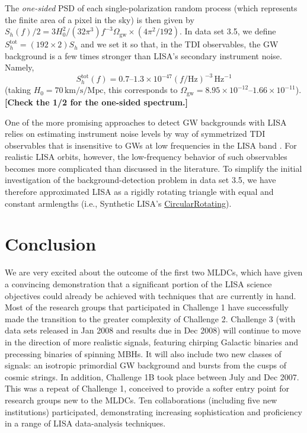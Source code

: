 \documentclass{iopart}
\begin{document}
The \emph{one-sided} PSD of each single-polarization random process (which represents the finite area of a pixel in the sky) is then given by $S_h(f)/2 = 3 H_0^2/(32 \pi^3) f^{-3} \Omega_\mathrm{gw} \times (4 \pi^2 / 192)$.
In data set 3.5, we define $S^\mathrm{tot}_h = (192 \times 2) S_h$ and we set it so that, in the TDI observables, the GW background is a few times stronger than LISA's secondary instrument noise. Namely, 
%
\begin{equation}
S^\mathrm{tot}_h(f) = 0.7\mbox{--}1.3 \times 10^{-47} (f/\mathrm{Hz})^{-3} \, \mathrm{Hz}^{-1}
\end{equation}
%
(taking $H_0 = 70 \, \mathrm{km} / \mathrm{s} / \mathrm{Mpc}$, this corresponds to $\Omega_\mathrm{gw}=8.95\times 10^{-12}\mbox{--}1.66\times 10^{-11}$). \textbf{[Check the 1/2 for the one-sided spectrum.]}

One of the more promising approaches to detect GW backgrounds with LISA relies on estimating instrument noise levels by way of symmetrized TDI observables that is insensitive to GWs at low frequencies in the LISA band \cite{zetapaper}. For realistic LISA orbits, however, the low-frequency behavior of such observables becomes more complicated than discussed in the literature. To simplify the initial investigation of the background-detection problem in data set 3.5, we have therefore approximated 
LISA as a rigidly rotating triangle with equal and constant armlengths (i.e., Synthetic LISA's \url{CircularRotating}).

\section{Conclusion}

We are very excited about the outcome of the first two MLDCs, which have given a convincing demonstration that a significant portion of the LISA science objectives could already be achieved with techniques that are currently in hand. Most of the research groups that participated in Challenge 1 have successfully made the transition to the greater complexity of Challenge 2. Challenge 3 (with data sets released in Jan 2008 and results due in Dec 2008) will continue to move in the direction of more realistic signals, featuring chirping Galactic binaries and precessing binaries of spinning MBHs. It will also include two new classes of signals: an isotropic primordial GW background and bursts from the cusps of cosmic strings. In addition, Challenge 1B took place between July and Dec 2007. This was a repeat of Challenge 1, conceived to provide a softer entry point for research groups new to the MLDCs. Ten collaborations (including five new institutions) participated, demonstrating increasing sophistication and proficiency in a range of LISA data-analysis techniques.
\end{document}
